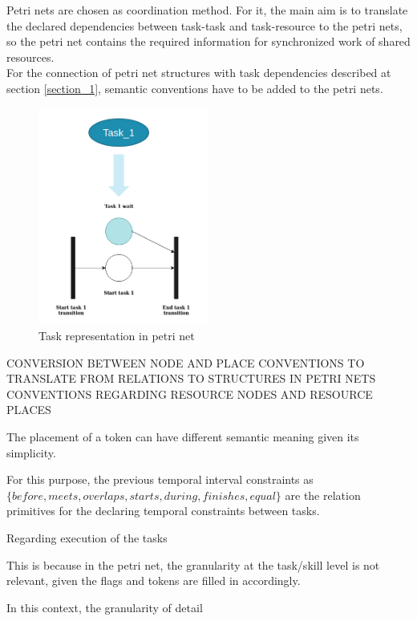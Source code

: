 \documentclass[a4paper,10pt]{article}
\begin{document}
Petri nets are chosen as coordination method. For it, the main aim is to translate the declared dependencies between task-task and task-resource to the petri nets, so the petri net contains the required information for synchronized work of shared resources.\\


For the connection of petri net structures with task dependencies described at section \ref{section_1}, semantic conventions have to be added to the petri nets.
\begin{figure}[h]
    \centering
    \includegraphics[width=0.5\textwidth]{task1_petri.png}
    \caption{Task representation in petri net}
    \label{fig:task1_petri}
\end{figure}

CONVERSION BETWEEN NODE AND PLACE 
CONVENTIONS TO TRANSLATE FROM RELATIONS TO STRUCTURES IN PETRI NETS
CONVENTIONS REGARDING RESOURCE NODES AND RESOURCE PLACES


The placement of a token can have different semantic meaning given its simplicity.

For this purpose, the previous temporal interval constraints as $\{ before ,meets ,overlaps ,starts ,during ,finishes ,equal \}$
are the relation primitives for the declaring temporal constraints between tasks.

Regarding execution of the tasks

This is because in the petri net, the granularity at the task/skill level is not relevant, given the flags and tokens are filled in accordingly.

In this context, the granularity of detail 
\end{document}
